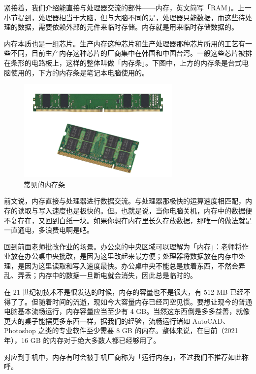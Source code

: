 紧接着，我们介绍能直接与处理器交流的部件——内存，英文简写「RAM」。上一小节提到，处理器相当于大脑，但与大脑不同的是，处理器只能数据，而这些待处理的数据，需要依赖外部的元件来临时存储。内存就是用来临时存储数据的。

内存本质也是一组芯片。生产内存这种芯片和生产处理器那种芯片所用的工艺有一些不同，目前生产内存这种芯片的厂商集中在韩国和中国台湾。一般这些芯片被排在条形的电路板上，这样的整体叫做「内存条」。下图中，上方的内存条是台式电脑使用的，下方的内存条是笔记本电脑使用的。

\begin{figure}[H]
  \centering
  \includegraphics[width=8cm]{assets/RAMs.jpg}
  \caption{常见的内存条}
  \label{rams}
\end{figure}

前文说，内存直接与处理器进行数据交流。与处理器那极快的运算速度相匹配，内存的读取与写入速度也是极快的。但。也就是说，当你电脑关机，内存中的数据便不复存在，又回到白纸一块。如果你想在内存里长久存放数据，那唯一的做法就是一直通电，多浪费电啊是吧。

回到前面老师批改作业的场景。办公桌的中央区域可以理解为「内存」：老师将作业放在办公桌中央批改，是因为这里改起来最方便；处理器将数据放在内存中处理，是因为这里读取和写入速度最快。办公桌中央不能总是放着东西，不然会弄乱、弄丢；内存中的数据一旦断电就会消失，因此总是临时的。

在 21 世纪初技术不是很发达的时候，内存的容量也不是很大，有 512 MB 已经不得了了。但随着时间的流逝，现如今大容量内存已经司空见惯。要想让现今的普通电脑基本流畅运行，内存容量应当至少有 4 GB。当然这东西倒是多多益善，就像更大的桌子能摆更多东西一样，据我们的经验，流畅运行诸如 AutoCAD、Photoshop 之类的专业软件至少需要 8 GB 的内存。整体来说，在目前（2021 年），16 GB 的内存对于绝大多数人都已经够用了。

\begin{note}
  对应到手机中，内存有时会被手机厂商称为「运行内存」，不过我们不推荐如此称呼。
\end{note}

